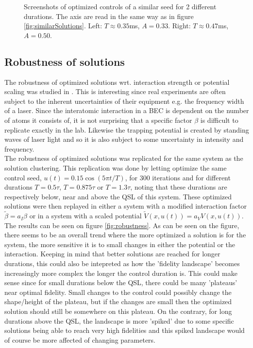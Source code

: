 \documentclass[a4paper, twocolumn]{revtex4-1}
\begin{document}
\begin{figure}
\begin{subfigure}{0.4\columnwidth}
	\end{subfigure}
	\caption{Screenshots of optimized controls of a similar seed for 2 different durations. The axis are read in the same way as in figure \ref{fig:similarSolutions}. Left: $T\approx 0.35$ms, $A=0.33$. Right: $T\approx 0.47$ms, $A=0.50$.}
	\label{fig:SimilarTimescales}
\end{figure}

\subsection{\label{subsec:robustness} Robustness of solutions}
The robustness of optimized solutions wrt. interaction strength or potential scaling was studied in \cite{GroupPaper}. This is interesting since real experiments are often subject to the inherent uncertainties of their equipment e.g. the frequency width of a laser. Since the interatomic interaction in a BEC is dependent on the number of atoms it consists of, it is not surprising that a specific factor $\beta$ is difficult to replicate exactly in the lab. Likewise the trapping potential is created by standing waves of laser light and so it is also subject to some uncertainty in intensity and frequency.  \\

The robustness of optimized solutions was replicated for the same system as the solution clustering. This replication was done by letting  optimize the same control seed, $u(t)=0.15\cos(5\pi t/T)$, for $300$ iterations and for different durations $T=0.5 \tau$, $T=0.875 \tau$ or $T=1.3 \tau$, noting that these durations are respectively below, near and above the QSL of this system. These optimized solutions were then replayed in either a system with a modified interaction factor $\tilde{\beta} = a_I \beta$ or in a system with a scaled potential $\tilde{V}(x,u(t)) = a_V V(x,u(t))$. The results can be seen on figure \ref{fig:robustness}. As can be seen on the figure, there seems to be an overall trend where the more optimized a solution is for the system, the more sensitive it is to small changes in either the potential or the interaction. Keeping in mind that better solutions are reached for longer durations, this could also be intepreted as how the 'fidelity landscape' becomes increasingly more complex the longer the control duration is. This could make sense since for small durations below the QSL, there could be many 'plateaus' near optimal fidelity. Small changes to the control could possibly change the shape/height of the plateau, but if the changes are small then the optimized solution should still be somewhere on this plateau. On the contrary, for long durations above the QSL, the landscape is more 'spiked' due to some specific solutions being able to reach very high fidelities and this spiked landscape would of course be more affected of changing parameters. \\
\end{document}

